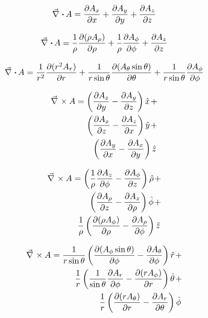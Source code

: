\documentclass[a4paper,10pt]{article}
\begin{document}
\begin{multicols}{2}
  \begin{equation*}
    \div A = \dep{A_x}{x} + \dep{A_y}{y} + \dep{A_z}{z}
  \end{equation*}
  
  \begin{equation*}
    \div A = \frac{1}{\rho} \dep{(\rho A_\rho)}{\rho} +
    \frac{1}{\rho} \dep{A_\phi}{\phi} +
    \dep{A_z}{z}
  \end{equation*}
  
  \begin{equation*}
    \div A = \frac{1}{r^2} \dep{(r^2 A_r)}{r} +
    \frac{1}{r \sin \theta} \dep{(A_\theta \sin\theta)}{\theta} +
    \frac{1}{r \sin\theta} \dep{A_\phi}{\phi}
  \end{equation*}

\begin{align*}
  \rot A = \lrb{\dep{A_z}{y} - \dep{A_y}{z}} \hat{x} + \\
  \lrb{\dep{A_x}{z} - \dep{A_z}{x}} \hat{y} + \\
  \lrb{\dep{A_y}{x} - \dep{A_x}{y}} \hat{z}
\end{align*}

\begin{align*}
  \rot A = \lrb{\frac{1}{\rho} \dep{A_z}{\phi} - \dep{A_\phi}{z}} \hat{\rho} + \\
  \lrb{\dep{A_\rho}{z} - \dep{A_z}{\rho}} \hat{\phi} + \\
  \frac{1}{\rho} \lrb{\dep{(\rho A_\phi)}{\rho} - \dep{A_\rho}{\phi}} \hat{z}
\end{align*}

\begin{align*}
  \rot A = \frac{1}{r \sin\theta} \lrb{\dep{(A_\phi \sin\theta)}{\phi} - \dep{A_\theta}{\phi}} \hat{r} + \\
  \frac{1}{r} \lrb{\frac{1}{\sin\theta} \dep{A_r}{\phi} - \dep{(r A_\phi)}{r}} \hat{\theta} + \\
  \frac{1}{r} \lrb{\dep{(r A_\theta)}{r} - \dep{A_r}{\theta}} \hat{\phi}
\end{align*}
\end{multicols}
\end{document}
